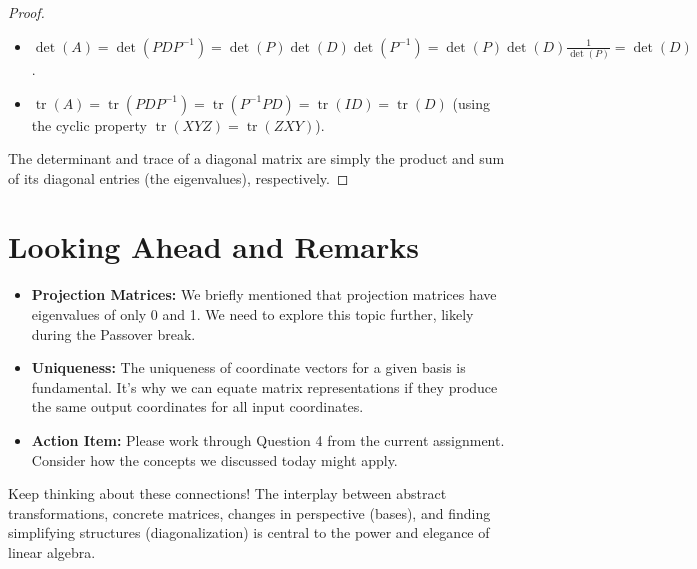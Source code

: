 \documentclass[11pt, a4paper]{article}
\theoremstyle{mytheoremstyle}
\theoremstyle{mydefstyle}
\DeclareMathOperator{\tr}{tr}    %
\begin{document}
\begin{proof}
\leavevmode
\begin{itemize}
    \item $\det(A) = \det(P D P^{-1}) = \det(P)\det(D)\det(P^{-1}) = \det(P)\det(D)\frac{1}{\det(P)} = \det(D)$.
    \item $\tr(A) = \tr(P D P^{-1}) = \tr(P^{-1} P D) = \tr(I D) = \tr(D)$ (using the cyclic property $\tr(XYZ) = \tr(ZXY)$).
\end{itemize}
The determinant and trace of a diagonal matrix are simply the product and sum of its diagonal entries (the eigenvalues), respectively.
\end{proof}

\section{Looking Ahead and Remarks}

\begin{itemize}
    \item \textbf{Projection Matrices:} We briefly mentioned that projection matrices have eigenvalues of only 0 and 1. We need to explore this topic further, likely during the Passover break.
    \item \textbf{Uniqueness:} The uniqueness of coordinate vectors for a given basis is fundamental. It's why we can equate matrix representations if they produce the same output coordinates for all input coordinates.
    \item \textbf{Action Item:} Please work through Question 4 from the current assignment. Consider how the concepts we discussed today might apply.
\end{itemize}

Keep thinking about these connections! The interplay between abstract transformations, concrete matrices, changes in perspective (bases), and finding simplifying structures (diagonalization) is central to the power and elegance of linear algebra.
\end{document}
